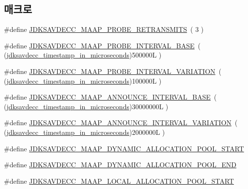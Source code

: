 \subsection*{매크로}
\begin{DoxyCompactItemize}
\item 
\#define \hyperlink{group__maap_ga556ac5c61c338764ed5e750395f0dd41}{J\+D\+K\+S\+A\+V\+D\+E\+C\+C\+\_\+\+M\+A\+A\+P\+\_\+\+P\+R\+O\+B\+E\+\_\+\+R\+E\+T\+R\+A\+N\+S\+M\+I\+TS}~( 3 )
\item 
\#define \hyperlink{group__maap_gad8ec6d4ac9740a07a7a5f65a4559df76}{J\+D\+K\+S\+A\+V\+D\+E\+C\+C\+\_\+\+M\+A\+A\+P\+\_\+\+P\+R\+O\+B\+E\+\_\+\+I\+N\+T\+E\+R\+V\+A\+L\+\_\+\+B\+A\+SE}~( (\hyperlink{group__util_gaca5142930a1fb7fba0d88a9c2d16a848}{jdksavdecc\+\_\+timestamp\+\_\+in\+\_\+microseconds})500000\+L )
\item 
\#define \hyperlink{group__maap_gae7cc533158607050fa170564541658ab}{J\+D\+K\+S\+A\+V\+D\+E\+C\+C\+\_\+\+M\+A\+A\+P\+\_\+\+P\+R\+O\+B\+E\+\_\+\+I\+N\+T\+E\+R\+V\+A\+L\+\_\+\+V\+A\+R\+I\+A\+T\+I\+ON}~( (\hyperlink{group__util_gaca5142930a1fb7fba0d88a9c2d16a848}{jdksavdecc\+\_\+timestamp\+\_\+in\+\_\+microseconds})100000\+L )
\item 
\#define \hyperlink{group__maap_gaed2e694a9d3873dc0c045c3d3996960b}{J\+D\+K\+S\+A\+V\+D\+E\+C\+C\+\_\+\+M\+A\+A\+P\+\_\+\+A\+N\+N\+O\+U\+N\+C\+E\+\_\+\+I\+N\+T\+E\+R\+V\+A\+L\+\_\+\+B\+A\+SE}~( (\hyperlink{group__util_gaca5142930a1fb7fba0d88a9c2d16a848}{jdksavdecc\+\_\+timestamp\+\_\+in\+\_\+microseconds})30000000\+L )
\item 
\#define \hyperlink{group__maap_ga48b3f8f27e97b81997b46a4544573728}{J\+D\+K\+S\+A\+V\+D\+E\+C\+C\+\_\+\+M\+A\+A\+P\+\_\+\+A\+N\+N\+O\+U\+N\+C\+E\+\_\+\+I\+N\+T\+E\+R\+V\+A\+L\+\_\+\+V\+A\+R\+I\+A\+T\+I\+ON}~( (\hyperlink{group__util_gaca5142930a1fb7fba0d88a9c2d16a848}{jdksavdecc\+\_\+timestamp\+\_\+in\+\_\+microseconds})2000000\+L )
\item 
\#define \hyperlink{group__maap_ga017f97144722763ab58c54a785161bca}{J\+D\+K\+S\+A\+V\+D\+E\+C\+C\+\_\+\+M\+A\+A\+P\+\_\+\+D\+Y\+N\+A\+M\+I\+C\+\_\+\+A\+L\+L\+O\+C\+A\+T\+I\+O\+N\+\_\+\+P\+O\+O\+L\+\_\+\+S\+T\+A\+RT}
\item 
\#define \hyperlink{group__maap_gadbac602ad778e595bffe6148884e4715}{J\+D\+K\+S\+A\+V\+D\+E\+C\+C\+\_\+\+M\+A\+A\+P\+\_\+\+D\+Y\+N\+A\+M\+I\+C\+\_\+\+A\+L\+L\+O\+C\+A\+T\+I\+O\+N\+\_\+\+P\+O\+O\+L\+\_\+\+E\+ND}
\item 
\#define \hyperlink{group__maap_ga36960965a02d8ab57b5339528373a5f8}{J\+D\+K\+S\+A\+V\+D\+E\+C\+C\+\_\+\+M\+A\+A\+P\+\_\+\+L\+O\+C\+A\+L\+\_\+\+A\+L\+L\+O\+C\+A\+T\+I\+O\+N\+\_\+\+P\+O\+O\+L\+\_\+\+S\+T\+A\+RT}

\end{DoxyCompactItemize}
